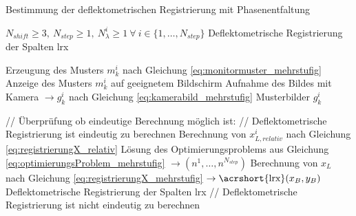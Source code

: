 \begin{algorithm}[H]
\caption{Bestimmung der deflektometrischen Registrierung mit Phasenentfaltung}
	\label{alg:bestimmungDeflektometrischeRegistrierung}
	\begin{algorithmic}[1]
		\Require $N_{shift} \geq 3, ~N_{step} \geq 1, ~N_\lambda^i \geq 1 ~\forall ~i \in \lbrace 1,\ldots,N_{step} \rbrace$
		\Ensure Deflektometrische Registrierung der Spalten \acrshort{lrx}
		
		\Statex		
		
					\State Erzeugung des Musters $m_k^i$ nach Gleichung \ref{eq:monitormuster_mehrstufig}
					\State Anzeige des Musters $m_k^i$ auf geeignetem Bildschirm
					\State Aufnahme des Bildes mit Kamera $\rightarrow g_k^i$ nach Gleichung \ref{eq:kamerabild_mehrstufig}
				\EndFor
			\EndFor
			\State \Return Musterbilder $g_k^i$
		\EndProcedure
		
		\Statex
		
			\State // Überprüfung ob eindeutige Berechnung möglich ist:
				\State // Deflektometrische Registrierung ist eindeutig zu berechnen
						\State Berechnung von $x_{L,relativ}^i$ nach Gleichung \ref{eq:registrierungX_relativ}
					\EndFor
					\State Lösung des Optimierungsproblems aus Gleichung \ref{eq:optimierungsProblem_mehrstufig} $\rightarrow (n^1,\ldots, n^{N_{step}})$
					\State Berechnung von $x_L$ nach Gleichung \ref{eq:registrierungX_mehrstufig} $\rightarrow \text{\acrshort{lrx}}(x_B, y_B)$
				\EndFor
				\State \Return Deflektometrische Registrierung der Spalten \acrshort{lrx}
			\Else
				\State // Deflektometrische Registrierung ist nicht eindeutig zu berechnen
				\State \Return
			\EndIf
		\EndProcedure
	\end{algorithmic}
\end{algorithm}